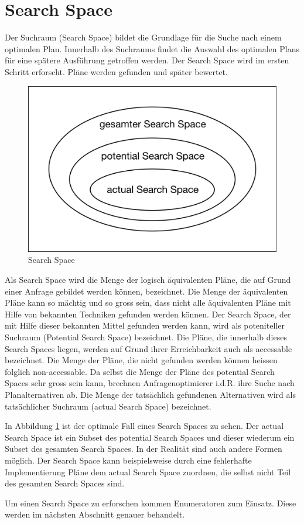 \section{Search Space}

Der Suchraum (Search Space) bildet die Grundlage für die Suche nach einem optimalen Plan. Innerhalb des Suchraums findet die Auswahl des optimalen Plans für eine spätere Ausführung getroffen werden. Der Search Space wird im ersten Schritt erforscht. Pläne werden gefunden und später bewertet.

\begin{figure}[h]
  \centering
  \includegraphics[width=\textwidth]{02_Grundlagen/SearchSpace.png}
  \caption{Search Space}
  \label{SearchSpace}
\end{figure}


Als Search Space wird die Menge der logisch äquivalenten Pläne, die auf Grund einer Anfrage gebildet werden können, bezeichnet. Die Menge der äquivalenten Pläne kann so mächtig und so gross sein, dass nicht alle äquivalenten Pläne mit Hilfe von bekannten Techniken gefunden werden können. Der Search Space, der mit Hilfe dieser bekannten Mittel gefunden werden kann, wird als poteniteller Suchraum (Potential Search Space) bezeichnet. Die Pläne, die innerhalb dieses Search Spaces liegen, werden auf Grund ihrer Erreichbarkeit auch als accessable bezeichnet. Die Menge der Pläne, die nicht gefunden werden können heissen folglich non-accessable. Da selbst die Menge der Pläne des potential Search Spaces sehr gross sein kann, brechnen Anfragenoptimierer i.d.R. ihre Suche nach Planalternativen ab. Die Menge der tatsächlich gefundenen Alternativen wird als tatsächlicher Suchraum (actual Search Space) bezeichnet.

In Abbildung \ref{SearchSpace} ist der optimale Fall eines Search Spaces zu sehen. Der actual Search Space ist ein Subset des potential Search Spaces und dieser wiederum ein Subset des gesamten Search Spaces. In der Realität sind auch andere Formen möglich. Der Search Space kann beispielsweise durch eine fehlerhafte Implementierung Pläne dem actual Search Space zuordnen, die selbst nicht Teil des gesamten Search Spaces sind.

Um einen Search Space zu erforschen kommen Enumeratoren zum Einsatz. Diese werden im nächsten Abschnitt genauer behandelt.